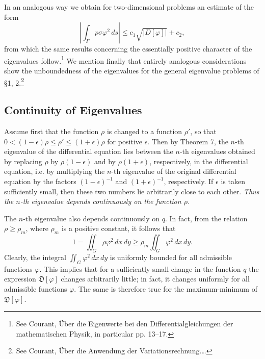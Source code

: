 In an analogous way we obtain for two-dimensional problems an estimate of the form
\begin{equation}\tag{20}
\left|\int_\Gamma p\sigma\varphi^2\,ds\right|\le c_1\sqrt{|D[\varphi]|}+c_2,
\end{equation}
from which the same results concerning the essentially positive character of the eigenvalues follow.\footnote{See Courant, \"Uber die Eigenwerte bei den Differentialgleichungen der mathematischen Physik, in particular pp. 13--17.} We mention finally that entirely analogous considerations show the unboundedness of the eigenvalues for the general eigenvalue problems of \S1, 2.\footnote{See Courant, \"Uber die Anwendung der Variationsrechnung.\ldots}

\subsection{Continuity of Eigenvalues}
Assume first that the function $\rho$ is changed to a function $\rho'$, so that $0<(1-\epsilon)\rho\le\rho'\le(1+\epsilon)\rho$ for positive $\epsilon$. Then by Theorem 7, the $n$-th eigenvalue of the differential equation lies between the $n$-th eigenvalues obtained by replacing $\rho$ by $\rho(1-\epsilon)$ and by $\rho(1+\epsilon)$, respectively, in the differential equation, i.e. by multiplying the $n$-th eigenvalue of the original differential equation by the factors $(1-\epsilon)^{-1}$ and $(1+\epsilon)^{-1}$, respectively. If $\epsilon$ is taken sufficiently small, then these two numbers lie arbitrarily close to each other. \emph{Thus the $n$-th eigenvalue depends continuously on the function $\rho$.}

The $n$-th eigenvalue also depends continuously on $q$. In fact, from the relation $\rho\ge\rho_m$, where $\rho_m$ is a positive constant, it follows that
\[
1=\iint_G\rho\varphi^2\,dx\,dy\ge\rho_m\iint_G\varphi^2\,dx\,dy.
\]
Clearly, the integral $\iint_G\varphi^2\,dx\,dy$ is uniformly bounded for all admissible functions $\varphi$. This implies that for a sufficiently small change in the function $q$ the expression $\mathfrak D[\varphi]$ changes arbitrarily little; in fact, it changes uniformly for all admissible functions $\varphi$. The same is therefore true for the maximum-minimum of $\mathfrak D[\varphi]$.

